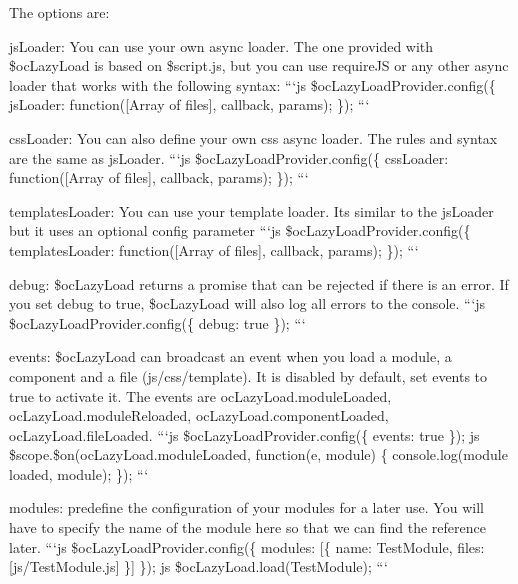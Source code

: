 The options are\+:
\begin{DoxyItemize}
\item {\ttfamily js\+Loader}\+: You can use your own async loader. The one provided with \$oc\+Lazy\+Load is based on \$script.\+js, but you can use require\+JS or any other async loader that works with the following syntax\+: ```js \$oc\+Lazy\+Load\+Provider.\+config(\{ js\+Loader\+: function(\mbox{[}\+Array of files\mbox{]}, callback, params); \}); ```
\item {\ttfamily css\+Loader}\+: You can also define your own css async loader. The rules and syntax are the same as js\+Loader. ```js \$oc\+Lazy\+Load\+Provider.\+config(\{ css\+Loader\+: function(\mbox{[}\+Array of files\mbox{]}, callback, params); \}); ```
\item {\ttfamily templates\+Loader}\+: You can use your template loader. It\textquotesingle{}s similar to the {\ttfamily js\+Loader} but it uses an optional config parameter ```js \$oc\+Lazy\+Load\+Provider.\+config(\{ templates\+Loader\+: function(\mbox{[}\+Array of files\mbox{]}, callback, params); \}); ```
\item {\ttfamily debug}\+: \$oc\+Lazy\+Load returns a promise that can be rejected if there is an error. If you set debug to true, \$oc\+Lazy\+Load will also log all errors to the console. ```js \$oc\+Lazy\+Load\+Provider.\+config(\{ debug\+: true \}); ```
\item {\ttfamily events}\+: \$oc\+Lazy\+Load can broadcast an event when you load a module, a component and a file (js/css/template). It is disabled by default, set events to true to activate it. The events are {\ttfamily oc\+Lazy\+Load.\+module\+Loaded}, {\ttfamily oc\+Lazy\+Load.\+module\+Reloaded}, {\ttfamily oc\+Lazy\+Load.\+component\+Loaded}, {\ttfamily oc\+Lazy\+Load.\+file\+Loaded}. ```js \$oc\+Lazy\+Load\+Provider.\+config(\{ events\+: true \}); {\ttfamily  }js \$scope.\$on(\textquotesingle{}oc\+Lazy\+Load.\+module\+Loaded\textquotesingle{}, function(e, module) \{ console.\+log(\textquotesingle{}module loaded\textquotesingle{}, module); \}); ```
\item {\ttfamily modules}\+: predefine the configuration of your modules for a later use. You will have to specify the name of the module here so that we can find the reference later. ```js \$oc\+Lazy\+Load\+Provider.\+config(\{ modules\+: \mbox{[}\{ name\+: \textquotesingle{}Test\+Module\textquotesingle{}, files\+: \mbox{[}\textquotesingle{}js/\+Test\+Module.\+js\textquotesingle{}\mbox{]} \}\mbox{]} \}); {\ttfamily  }js \$oc\+Lazy\+Load.\+load(\textquotesingle{}Test\+Module\textquotesingle{}); ```
\end{DoxyItemize}

